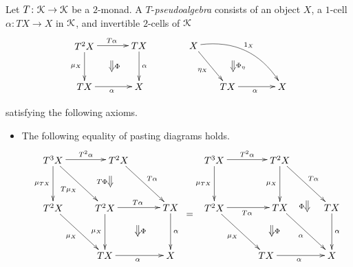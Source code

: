 \begin{Defi}\label{Defi:pseudoalgebra}
Let $T \colon \mathcal{K} \rightarrow \mathcal{K}$ be a $2$-monad. A $T$-\textit{pseudoalgebra} consists of an object $X$, a $1$-cell $\alpha \colon TX \rightarrow X$ in $\mathcal{K}$, and invertible $2$-cells of $\mathcal{K}$
    \[
        \xy
            (0,0)*+{T^2X}="00";
            (20,0)*+{TX}="10";
            (0,-15)*+{TX}="01";
            (20,-15)*+{X}="11";
            {\ar^{T\alpha} "00" ; "10"};
            {\ar^{\alpha} "10" ; "11"};
            {\ar_{\mu_X} "00" ;  "01"};
            {\ar_{\alpha} "01" ; "11"};
            {\ar@{=>}^{\Phi} (10,-5.5) ; (10,-9.5)};
            (40,0)*+{X}="20";
            (52.5,-15)*+{TX}="31";
            (72.5,-15)*+{X}="41";
            {\ar_{\eta_X} "20" ; "31"};
            {\ar_{\alpha} "31" ; "41"};
            {\ar@/^1.5pc/^{1_X} "20" ; "41"};
            {\ar@{=>}^{\Phi_{\eta}} (54.5,-5.5) ; (54.5,-9.5)};
        \endxy
    \]

satisfying the following axioms.
    \begin{itemize}
        \item The following equality of pasting diagrams holds.
    \[
        \xy
            (5,0)*+{T^3X}="t3xl";
            (29,0)*+{T^2X}="t2xl1";
            (5,-17.5)*+{T^2X}="t2xl2";
            (24,-35)*+{TX}="txl1";
            (48,-17.5)*+{TX}="txl2";
            (48,-35)*+{X}="xl";
            (24,-17.5)*+{T^2X}="t2xl3";
            {\ar^{T^2\alpha} "t3xl" ; "t2xl1"};
            {\ar^{T\alpha} "t2xl1" ; "txl2"};
            {\ar^{\alpha} "txl2" ; "xl"};
            {\ar_{\mu_{TX}} "t3xl" ; "t2xl2"};
            {\ar_{\mu_X} "t2xl2" ; "txl1"};
            {\ar_{\alpha} "txl1" ; "xl"};
            {\ar_{T\mu_X} "t3xl" ; "t2xl3"};
            {\ar^{T\alpha} "t2xl3" ; "txl2"};
            {\ar_{\mu_X} "t2xl3" ; "txl1"};
            {\ar@{=>}_{T\Phi} (26,-6) ; (26,-10)};
            {\ar@{=>}^{\Phi} (36,-24) ; (36,-28)};
            (64,0)*+{T^3X}="t3xr";
            (88,0)*+{T^2X}="t2xr1";
            (64,-17.5)*+{T^2X}="t2xr2";
            (83,-35)*+{TX}="txr1";
            (107,-17.5)*+{TX}="txr2";
            (107,-35)*+{X}="xr";
            (88,-17.5)*+{TX}="txr3";
            {\ar^{T^2\alpha} "t3xr" ; "t2xr1"};
            {\ar^{T\alpha} "t2xr1" ; "txr2"};
            {\ar^{\alpha} "txr2" ; "xr"};
            {\ar_{\mu_{TX}} "t3xr" ; "t2xr2"};
            {\ar_{\mu_X} "t2xr2" ; "txr1"};
            {\ar_{\alpha} "txr1" ; "xr"};
            {\ar_{T\alpha} "t2xr2" ; "txr3"};
            {\ar_{\alpha} "txr3" ; "xr"};
            {\ar_{\mu_X} "t2xr1" ; "txr3"};
            {\ar@{=>}_{\Phi} (98,-15) ; (98,-19)};
            {\ar@{=>}^{\Phi} (85,-24) ; (85,-28)};
            {\ar@{=} (54,-20) ; (56,-20)};
        \endxy
    \]


\end{itemize}
\end{Defi}
